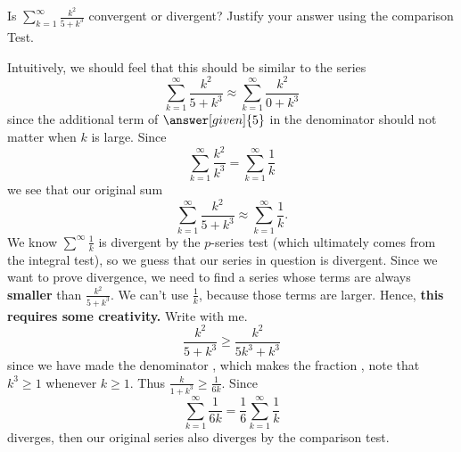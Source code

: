 \documentclass{ximera}
\begin{document}
\begin{example}
Is $\sum_{k=1}^\infty \frac{k^2}{5+k^3}$ convergent or divergent?
Justify your answer using the comparison Test.
\begin{explanation}
  Intuitively, we should feel that this should be similar to the
  series
  \[
  \sum_{k=1}^\infty \frac{k^2}{5+k^3} \approx \sum_{k=1}^\infty \frac{k^2}{0+k^3}
  \]
  since the additional term of $\answer[given]{5}$ in the denominator should not
  matter when $k$ is large. Since
  \[
  \sum_{k=1}^\infty \frac{k^2}{k^3} =\sum_{k=1}^\infty \frac{1}{k}
  \]
  we see that our original sum
  \[
  \sum_{k=1}^\infty \frac{k^2}{5+ k^3} \approx \sum_{k=1}^\infty \frac{1}{k}.
  \]
  We know $\sum^\infty \frac{1}{k}$ is divergent by the $p$-series
  test (which ultimately comes from the integral test), so we guess that our series 
  in question is divergent.  Since we want
  to prove divergence, we need to find a series whose terms are
  always \textbf{smaller} than $\frac{k^2}{5+ k^3}$.  We can't use $\frac{1}{k}$, because 
  those terms are larger.  Hence, \textbf{this
    requires some creativity.} Write with me.
  \[
  \frac{k^2}{5+k^3} \geq \frac{k^2}{5k^3+k^3} 
  \]
  since we have made the denominator
  , which makes
  the fraction ,
  note that $k^3 \geq 1$ whenever $k \geq 1$.  Thus $\frac{k}{1+k^3}
  \geq \frac{1}{6k}$.  Since
  \[
  \sum_{k=1}^\infty\frac{1}{6k} = \frac{1}{6} \sum_{k=1}^\infty
  \frac{1}{k}
  \]
  diverges, then our original series also diverges by the comparison
  test.
\end{explanation}
\end{example}
\end{document}
